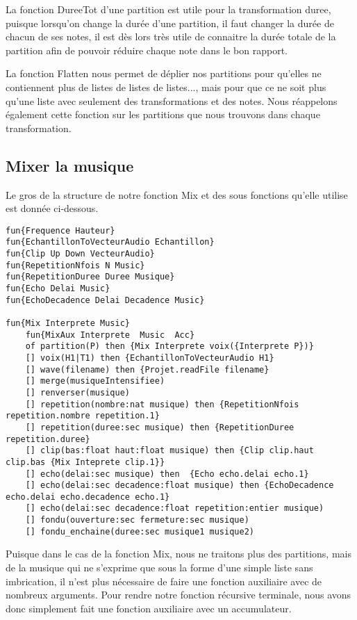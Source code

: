 \documentclass[a4paper,12pt]{report}
\begin{document}
La fonction DureeTot d'une partition est utile pour la transformation duree, puisque lorsqu'on change la durée d'une partition, il faut changer la durée de chacun de ses notes, il est dès lors très utile de connaitre la durée totale de la partition afin de pouvoir réduire chaque note dans le bon rapport. 

La fonction Flatten nous permet de déplier nos partitions pour qu'elles ne contiennent plus de listes de listes de listes..., mais pour que ce ne soit plus qu'une liste avec seulement des transformations et des notes. Nous réappelons également cette fonction sur les partitions que nous trouvons dans chaque transformation.

\subsection{Mixer la musique}
Le gros de la structure de notre fonction Mix et des sous fonctions qu'elle utilise est donnée ci-dessous.

\begin{lstlisting}[frame=single] 
fun{Frequence Hauteur}
fun{EchantillonToVecteurAudio Echantillon}
fun{Clip Up Down VecteurAudio}
fun{RepetitionNfois N Music}
fun{RepetitionDuree Duree Musique}
fun{Echo Delai Music}
fun{EchoDecadence Delai Decadence Music}

fun{Mix Interprete Music}
	fun{MixAux Interprete  Music  Acc}
	of partition(P) then {Mix Interprete voix({Interprete P})}
	[] voix(H1|T1) then {EchantillonToVecteurAudio H1}
	[] wave(filename) then {Projet.readFile filename}
	[] merge(musiqueIntensifiee)
	[] renverser(musique) 
	[] repetition(nombre:nat musique) then {RepetitionNfois repetition.nombre repetition.1}
	[] repetition(duree:sec musique) then {RepetitionDuree repetition.duree}
	[] clip(bas:float haut:float musique) then {Clip clip.haut clip.bas {Mix Inteprete clip.1}}
	[] echo(delai:sec musique) then  {Echo echo.delai echo.1}
	[] echo(delai:sec decadence:float musique) then {EchoDecadence echo.delai echo.decadence echo.1}
	[] echo(delai:sec decadence:float repetition:entier musique)
	[] fondu(ouverture:sec fermeture:sec musique)
	[] fondu_enchaine(duree:sec musique1 musique2)

\end{lstlisting}

Puisque dans le cas de la fonction Mix, nous ne traitons plus des partitions, mais de la musique qui ne s'exprime que sous la forme d'une simple liste sans imbrication, il n'est plus nécessaire de faire une fonction auxiliaire avec de nombreux arguments. Pour rendre notre fonction récursive terminale, nous avons donc simplement fait une fonction auxiliaire avec un accumulateur. 
\end{document}
